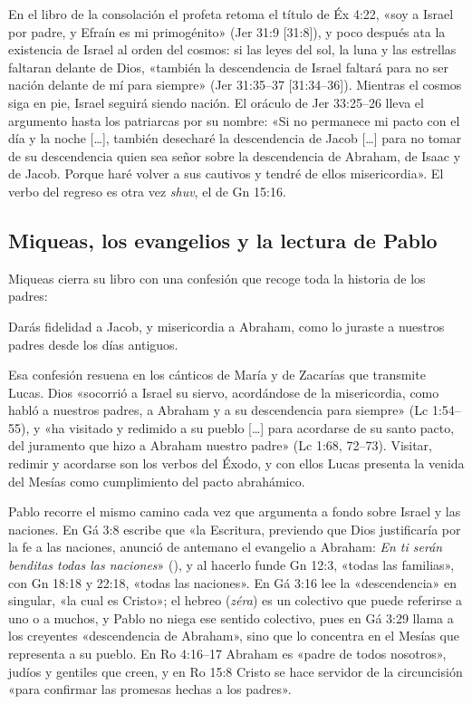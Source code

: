 En el libro de la consolación el profeta retoma el título de Éx 4:22, «soy a Israel por padre, y Efraín es mi primogénito» (Jer 31:9 [31:8]), y poco después ata la existencia de Israel al orden del cosmos: si las leyes del sol, la luna y las estrellas faltaran delante de Dios, «también la descendencia de Israel faltará para no ser nación delante de mí para siempre» (Jer 31:35–37 [31:34–36]). Mientras el cosmos siga en pie, Israel seguirá siendo nación. El oráculo de Jer 33:25–26 lleva el argumento hasta los patriarcas por su nombre: «Si no permanece mi pacto con el día y la noche [\ldots], también desecharé la descendencia de Jacob [\ldots] para no tomar de su descendencia quien sea señor sobre la descendencia de Abraham, de Isaac y de Jacob. Porque haré volver a sus cautivos y tendré de ellos misericordia». El verbo del regreso es otra vez \emph{shuv}, el de Gn 15:16.

\subsection{Miqueas, los evangelios y la lectura de Pablo}
Miqueas cierra su libro con una confesión que recoge toda la historia de los padres:

\begin{cita}Darás fidelidad a Jacob, y misericordia a Abraham, como lo juraste a nuestros padres desde los días antiguos.\end{cita}

Esa confesión resuena en los cánticos de María y de Zacarías que transmite Lucas. Dios «socorrió a Israel su siervo, acordándose de la misericordia, como habló a nuestros padres, a Abraham y a su descendencia para siempre» (Lc 1:54–55), y «ha visitado y redimido a su pueblo [\ldots] para acordarse de su santo pacto, del juramento que hizo a Abraham nuestro padre» (Lc 1:68, 72–73). Visitar, redimir y acordarse son los verbos del Éxodo, y con ellos Lucas presenta la venida del Mesías como cumplimiento del pacto abrahámico.

Pablo recorre el mismo camino cada vez que argumenta a fondo sobre Israel y las naciones. En Gá 3:8 escribe que «la Escritura, previendo que Dios justificaría por la fe a las naciones, anunció de antemano el evangelio a Abraham: \emph{En ti serán benditas todas las naciones}» (), y al hacerlo funde Gn 12:3, «todas las familias», con Gn 18:18 y 22:18, «todas las naciones». En Gá 3:16 lee la «descendencia» en singular, «la cual es Cristo»; el hebreo  (\emph{zéra}) es un colectivo que puede referirse a uno o a muchos, y Pablo no niega ese sentido colectivo, pues en Gá 3:29 llama a los creyentes «descendencia de Abraham», sino que lo concentra en el Mesías que representa a su pueblo. En Ro 4:16–17 Abraham es «padre de todos nosotros», judíos y gentiles que creen, y en Ro 15:8 Cristo se hace servidor de la circuncisión «para confirmar las promesas hechas a los padres».

